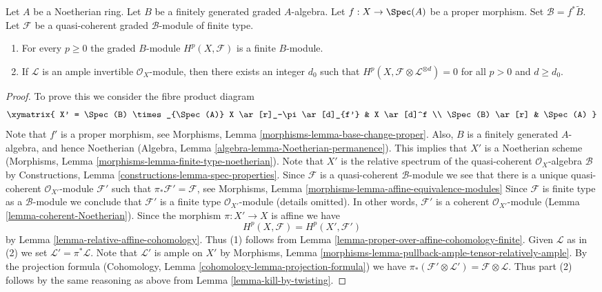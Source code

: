 \begin{lemma}
\label{lemma-graded-finiteness}
Let $A$ be a Noetherian ring.
Let $B$ be a finitely generated graded $A$-algebra.
Let $f : X \to \Spec(A)$ be a proper morphism.
Set $\mathcal{B} = f^*\widetilde B$.
Let $\mathcal{F}$ be a quasi-coherent
graded $\mathcal{B}$-module of finite type.
\begin{enumerate}
\item For every $p \geq 0$ the graded $B$-module $H^p(X, \mathcal{F})$
is a finite $B$-module.
\item If $\mathcal{L}$ is an ample invertible $\mathcal{O}_X$-module,
then there exists an integer $d_0$ such that
$H^p(X, \mathcal{F} \otimes \mathcal{L}^{\otimes d}) = 0$
for all $p > 0$ and $d \geq d_0$.
\end{enumerate}
\end{lemma}

\begin{proof}
To prove this we consider the fibre product diagram
$$
\xymatrix{
X' = \Spec(B) \times_{\Spec(A)} X
\ar[r]_-\pi \ar[d]_{f'} &
X \ar[d]^f \\
\Spec(B) \ar[r] &
\Spec(A)
}
$$
Note that $f'$ is a proper morphism, see
Morphisms, Lemma \ref{morphisms-lemma-base-change-proper}.
Also, $B$ is a finitely generated $A$-algebra, and hence
Noetherian (Algebra, Lemma \ref{algebra-lemma-Noetherian-permanence}).
This implies that $X'$ is a Noetherian scheme
(Morphisms, Lemma \ref{morphisms-lemma-finite-type-noetherian}).
Note that $X'$ is the relative spectrum of the quasi-coherent
$\mathcal{O}_X$-algebra $\mathcal{B}$ by
Constructions, Lemma \ref{constructions-lemma-spec-properties}.
Since $\mathcal{F}$ is a quasi-coherent $\mathcal{B}$-module
we see that there is a unique quasi-coherent
$\mathcal{O}_{X'}$-module $\mathcal{F}'$ such that
$\pi_*\mathcal{F}' = \mathcal{F}$, see
Morphisms, Lemma \ref{morphisms-lemma-affine-equivalence-modules}
Since $\mathcal{F}$ is finite type as a $\mathcal{B}$-module we
conclude that $\mathcal{F}'$ is a finite type
$\mathcal{O}_{X'}$-module (details omitted). In other words,
$\mathcal{F}'$ is a coherent $\mathcal{O}_{X'}$-module
(Lemma \ref{lemma-coherent-Noetherian}).
Since the morphism $\pi : X' \to X$ is affine we have
$$
H^p(X, \mathcal{F}) = H^p(X', \mathcal{F}')
$$
by Lemma \ref{lemma-relative-affine-cohomology}.
Thus (1) follows from
Lemma \ref{lemma-proper-over-affine-cohomology-finite}.
Given $\mathcal{L}$ as in (2) we set
$\mathcal{L}' = \pi^*\mathcal{L}$. Note that $\mathcal{L}'$ is
ample on $X'$ by
Morphisms, Lemma \ref{morphisms-lemma-pullback-ample-tensor-relatively-ample}.
By the projection formula
(Cohomology, Lemma \ref{cohomology-lemma-projection-formula}) we have
$\pi_*(\mathcal{F}' \otimes \mathcal{L}') = \mathcal{F} \otimes \mathcal{L}$.
Thus part (2) follows by the same reasoning as above from
Lemma \ref{lemma-kill-by-twisting}.
\end{proof}












